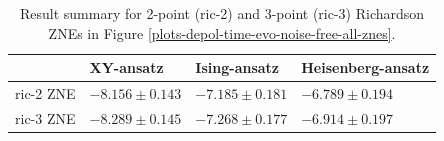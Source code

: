 \begin{table}[h]
\caption{Result summary for 2-point (ric-2) and 3-point (ric-3) Richardson ZNEs in Figure \ref{plots-depol-time-evo-noise-free-all-znes}.}
\begin{tabular}{@{}llll@{}}
\toprule
  & XY-ansatz  & Ising-ansatz  & Heisenberg-ansatz\\
\midrule
ric-2 ZNE & $-8.156 \pm 0.143$ & $-7.185 \pm 0.181$ & $-6.789 \pm 0.194$ \\
ric-3 ZNE & $-8.289 \pm 0.145$ & $-7.268 \pm 0.177$ & $-6.914 \pm 0.197$ \\
\bottomrule
\end{tabular}
\label{table-depol-time-evo-noise-free-all-znes}
\end{table}
